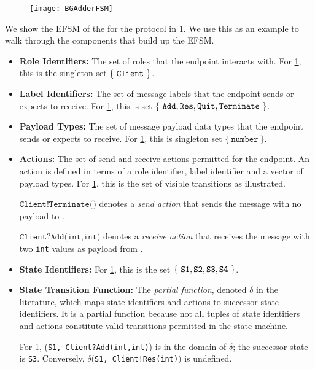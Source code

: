 \begin{figure}[!h]
\centering
\texttt{[image: BGAdderFSM]}
\label{fig:bgadderfsm}
\end{figure}

We show the EFSM of the  for the
 protocol in \cref{fig:bgadderfsm}.
We use this as an example to walk through
the components that build up the EFSM.

\begin{itemize}

\item \textbf{Role Identifiers:}
The set of roles that the endpoint interacts with.
For \cref{fig:bgadderfsm}, this is the singleton set
$\{~\texttt{Client}~\}$.

\item \textbf{Label Identifiers:}
The set of message labels that the endpoint sends or
expects to receive.
For \cref{fig:bgadderfsm}, this is set
$\{~\texttt{Add}, \texttt{Res}, \texttt{Quit}, \texttt{Terminate}~\}$.

\item \textbf{Payload Types:}
The set of message payload data types that the endpoint
sends or expects to receive.
For \cref{fig:bgadderfsm}, this is singleton set
$\{~\texttt{number}~\}$.

\item \textbf{Actions:}
The set of send and receive actions permitted for the endpoint.
An action is defined in terms of a role identifier,
label identifier and a vector of payload types.
For \cref{fig:bgadderfsm}, this is the set of visible
transitions as illustrated.

$\texttt{Client!Terminate()}$ denotes a \textit{send action}
that sends the  message with 
no payload to .

$\texttt{Client?Add(int,int)}$ denotes a \textit{receive action}
that receives the  message with two \texttt{int}
values as payload from .

\item \textbf{State Identifiers:}
For \cref{fig:bgadderfsm}, this is the set 
$\{~ \texttt{S1}, \texttt{S2}, \texttt{S3}, \texttt{S4}~\}$.

\item \textbf{State Transition Function:}
The \textit{partial function}, denoted $\delta$ in the literature,
which maps state identifiers and actions to
successor state identifiers.
It is a partial function because not all tuples
of state identifiers and actions constitute valid transitions
permitted in the state machine.

For \cref{fig:bgadderfsm},
(\texttt{S1, Client?Add(int,int)}) is in the domain
of $\delta$; the successor state is \texttt{S3}.
Conversely, $\delta($\texttt{S1, Client!Res(int)}$)$
is undefined.
\end{itemize}

